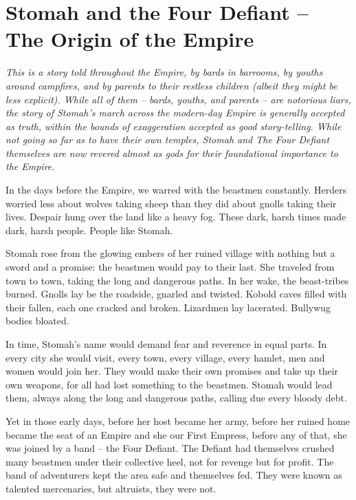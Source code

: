 \section{Stomah and the Four Defiant -- The Origin of the Empire}

\textit{This is a story told throughout the Empire, by bards in barrooms, by youths around
  campfires, and by parents to their restless children (albeit they might be less explicit).
While all of them -- bards, youths, and parents -- are notorious liars, the story of Stomah's
  march across the modern-day Empire is generally accepted as truth, within the bounds of
  exaggeration accepted as good story-telling.
While not going so far as to have their own temples, Stomah and The Four Defiant themselves are now
  revered almost as gods for their foundational importance to the Empire.}

\medskip

In the days before the Empire, we warred with the beastmen constantly.
Herders worried less about wolves taking sheep than they did about gnolls taking their lives.
Despair hung over the land like a heavy fog.
These dark, harsh times made dark, harsh people.
People like Stomah.

Stomah rose from the glowing embers of her ruined village with nothing but a sword and a promise:
  the beastmen would pay to their last.
She traveled from town to town, taking the long and dangerous paths.
In her wake, the beast-tribes burned.
Gnolls lay be the roadside, gnarled and twisted.
Kobold caves filled with their fallen, each one cracked and broken.
Lizardmen lay lacerated.
Bullywug bodies bloated.

In time, Stomah's name would demand fear and reverence in equal parts.
In every city she would visit, every town, every village, every hamlet,
  men and women would join her.
They would make their own promises and take up their own weapons, for all had lost something
  to the beastmen.
Stomah would lead them, always along the long and dangerous paths, calling due every bloody debt.

Yet in those early days, before her host became her army, before her ruined home became the seat of
  an Empire and she our First Empress, before any of that, she was joined by a band
  -- the Four Defiant.
The Defiant had themselves crushed many beastmen under their collective heel,
  not for revenge but for profit.
The band of adventurers kept the area safe and themselves fed.
They were known as talented mercenaries, but altruists, they were not.


